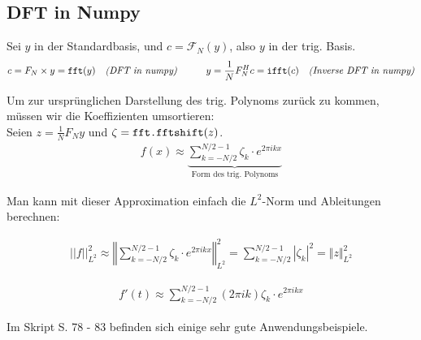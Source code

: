 \subsection{DFT in Numpy}

Sei $y$ in der Standardbasis, und $c = \mathcal{F}_N(y)$, also $y$ in der trig. Basis.
$$
    c = F_N \times y = \verb|fft|(y)\quad \textit{(DFT in numpy)} \quad \quad \quad y = \frac{1}{N}F_N^Hc = \verb|ifft|(c)\quad \textit{(Inverse DFT in numpy)}
$$

Um zur ursprünglichen Darstellung des trig. Polynoms zurück zu kommen, müssen wir die Koeffizienten umsortieren: \\
Seien $z = \frac{1}{N} F_N y$ und  $\zeta = \verb|fft.fftshift|(z)$. 
\begin{align*}
    f(x) \approx \underbrace{\sum_{k=-N/2}^{N/2-1} \zeta_k \cdot e^{2 \pi ikx} }_{\text{Form des trig. Polynoms}}
\end{align*}

\setcounter{all}{13}
\inlineremark Man kann mit dieser Approximation einfach die $L^2$-Norm und Ableitungen berechnen:
\begin{multicols}{2}
\begin{align*}
    ||f||^2_{L^2} \approx \left\Vert \sum_{k=-N/2}^{N/2-1} \zeta_k \cdot e^{2 \pi ikx} \right\Vert^2_{L^2} = \sum_{k=-N/2}^{N/2-1} |\zeta_k|^2 = \Vert z \Vert^2_{L^2}
\end{align*}

\newcolumn

\begin{align*}
    f'(t) \approx \sum_{k=-N/2}^{N/2-1} (2\pi ik) \zeta_k \cdot e^{2 \pi ikx} 
\end{align*}
\end{multicols}

Im Skript S. 78 - 83 befinden sich einige sehr gute Anwendungsbeispiele.